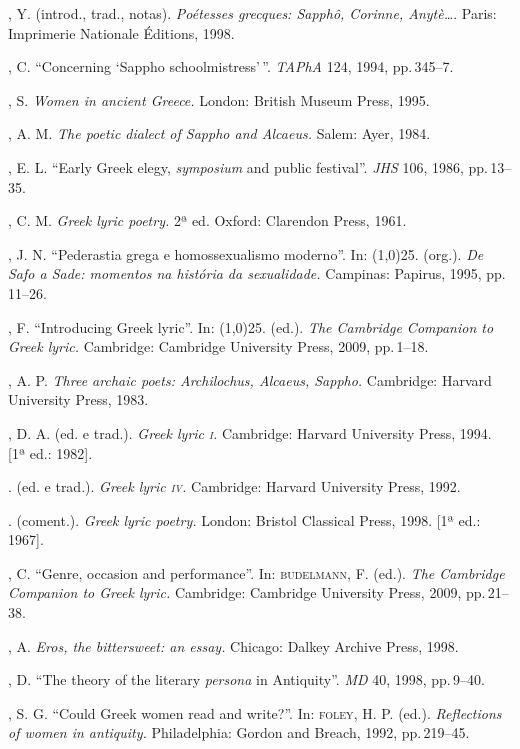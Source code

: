 \begin{bibliohedra}
, Y. (introd., trad., notas). \textit{Poétesses grecques:
Sapphô, Corinne, Anytè\ldots{}}. Paris: Imprimerie Nationale Éditions, 1998.

, C. “Concerning ‘Sappho schoolmistress’\,”. \textit{TAPhA} 124,
1994, pp.\,345--7.

, S. \textit{Women in ancient Greece.} London: British Museum
Press, 1995.

, A. M. \textit{The poetic dialect of Sappho and Alcaeus.} Salem:
Ayer, 1984. 

, E. L. “Early Greek elegy, \textit{symposium} and public festival”.
\textit{JHS} 106, 1986, pp.\,13--35.

, C. M. \textit{Greek lyric poetry.} 2ª
ed. Oxford: Clarendon Press, 1961.

, J. N. “Pederastia grega e homossexualismo moderno”. In:
\line(1,0){25}. (org.). \textit{De Safo a Sade: momentos na história da
sexualidade.} Campinas: Papirus, 1995, pp.\,11--26.

, F. “Introducing Greek lyric”. In:
\line(1,0){25}. (ed.). \textit{The Cambridge
Companion to Greek lyric.} Cambridge: Cambridge University Press, 2009, pp.\,1--18.

, A. P. \textit{Three archaic poets: Archilochus, Alcaeus,
Sappho.} Cambridge: Harvard University Press, 1983. 

, D. A. (ed. e trad.). \textit{Greek lyric \textsc{i}.} Cambridge:
Harvard University Press, 1994. {[}1ª ed.: 1982{]}.

\titidem. (ed. e trad.). \textit{Greek lyric \textsc{iv}.} Cambridge: Harvard
University Press, 1992.

\titidem. (coment.). \textit{Greek lyric poetry.} London: Bristol
Classical Press, 1998. {[}1ª ed.: 1967{]}. 

, C. “Genre, occasion and performance”. In:
\textsc{budelmann}, F. (ed.). \textit{The Cambridge Companion to Greek
lyric.} Cambridge: Cambridge University Press, 2009, pp.\,21--38.

, A. \textit{Eros, the bittersweet: an essay.} Chicago:
Dalkey Archive Press, 1998.

, D. “The theory of the literary \textit{persona} in Antiquity”.
\textit{MD} 40, 1998, pp.\,9--40.

, S. G. “Could Greek women read and write?”. In: \textsc{foley}, H.
P. (ed.). \textit{Reflections of women in antiquity.} Philadelphia: Gordon and
Breach, 1992, pp.\,219--45.


\end{bibliohedra}
